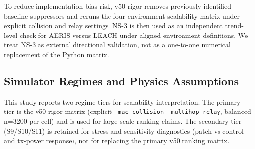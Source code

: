 ﻿\documentclass[sensors,article,submit,moreauthors,pdftex]{Definitions/mdpi}
\begin{document}
To reduce implementation-bias risk, v50-rigor removes previously identified baseline suppressors and reruns the four-environment scalability matrix under explicit collision and relay settings. NS-3 is then used as an independent trend-level check for AERIS versus LEACH under aligned environment definitions. We treat NS-3 as external directional validation, not as a one-to-one numerical replacement of the Python matrix.

\subsection{Simulator Regimes and Physics Assumptions}
This study reports two regime tiers for scalability interpretation. The primary tier is the v50-rigor matrix (explicit \texttt{--mac-collision --multihop-relay}, balanced n=3200 per cell) and is used for large-scale ranking claims. The secondary tier (S9/S10/S11) is retained for stress and sensitivity diagnostics (patch-vs-control and tx-power response), not for replacing the primary v50 ranking matrix.

\begin{table}[H]
\caption{Evidence-regime map used in this manuscript.}
\label{tab:regime_map}
\centering
{}
\end{table}
\end{document}
